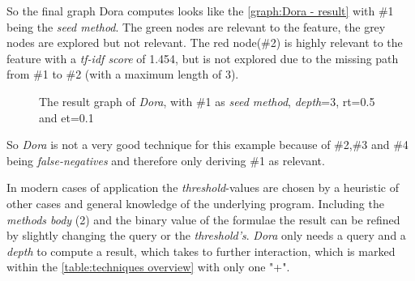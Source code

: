 So the final graph Dora computes looks like the \autoref{graph:Dora - result} with \#1 being the \textit{seed method}. The green nodes are relevant to the feature, the grey nodes are explored but not relevant. The red node(\#2) is highly relevant to the feature with a \emph{tf-idf score} of 1.454, but is not explored due to the missing path from \#1 to \#2 (with a maximum length of 3).
\begin{figure}[h]
	\centering
	\caption{The result graph of \textit{Dora}, with \#1 as \textit{seed method}, \textit{depth}=3, rt=0.5 and et=0.1}
	\label{graph:Dora - result}
\end{figure}
So \emph{Dora} is not a very good technique for this example because of \#2,\#3 and \#4 being \textit{false-negatives} and therefore only deriving \#1 as relevant.


 In modern cases of application the \textit{threshold}-values are chosen by a heuristic of other cases and general knowledge of the underlying program. Including the \textit{methods body} (2) and the binary value of the formulae the result can be refined by slightly changing the query or the \textit{threshold's}. \newline
\emph{Dora} only needs a query and a \textit{depth} to compute a result, which takes to further interaction, which is marked within the \autoref{table:techniques overview} with only one "+".

